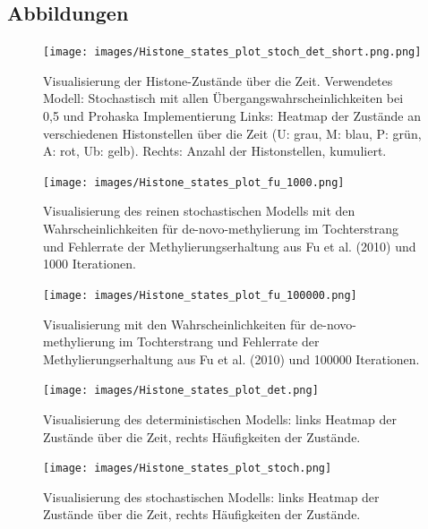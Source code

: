 \documentclass{SeminarV2}
\begin{document}
\begin{itemize}
\section{Abbildungen}

\begin{figure}[htbp]
  \centering
  \texttt{[image: images/Histone\_states\_plot\_stoch\_det\_short.png.png]}
  \caption{Visualisierung der Histone-Zust\"{a}nde \"{u}ber die Zeit. Verwendetes Modell: Stochastisch mit allen Übergangswahrscheinlichkeiten bei 0,5 und Prohaska Implementierung Links: Heatmap der Zust\"{a}nde an verschiedenen 
  Histonstellen \"{u}ber die Zeit (U: grau, M: blau, P: gr\"{u}n, A: rot, Ub: gelb). Rechts: Anzahl der Histonstellen, kumuliert.}
  \label{fig:Histone_states}
\end{figure}

\begin{figure}[htbp]
  \centering
  \texttt{[image: images/Histone\_states\_plot\_fu\_1000.png]}
  \caption{Visualisierung des reinen stochastischen Modells mit den Wahrscheinlichkeiten für de-novo-methylierung im Tochterstrang und Fehlerrate der Methylierungserhaltung aus Fu et al. (2010) und 1000 Iterationen. \cite{fu-2010}}
  \label{fig:Histone_states_1000}
\end{figure}

\begin{figure}[htbp]
  \centering
  \texttt{[image: images/Histone\_states\_plot\_fu\_100000.png]}
  \caption{Visualisierung mit den Wahrscheinlichkeiten für de-novo-methylierung im Tochterstrang und Fehlerrate der Methylierungserhaltung aus Fu et al. (2010) und 100000 Iterationen. \cite{fu-2010}}
  \label{fig:Histone_states_fu_100000}
\end{figure}

\begin{figure}[htbp]
\centering
\texttt{[image: images/Histone\_states\_plot\_det.png]}
\caption{Visualisierung des deterministischen Modells: links Heatmap der Zustände über die Zeit, rechts Häufigkeiten der Zustände.}
\label{fig:Histone_states_det}
\end{figure}

\begin{figure}[htbp]
\centering
\texttt{[image: images/Histone\_states\_plot\_stoch.png]}
\caption{Visualisierung des stochastischen Modells: links Heatmap der Zustände über die Zeit, rechts Häufigkeiten der Zustände.}
\label{fig:Histone_states_stoch}
\end{figure}



\end{itemize}
\end{document}
